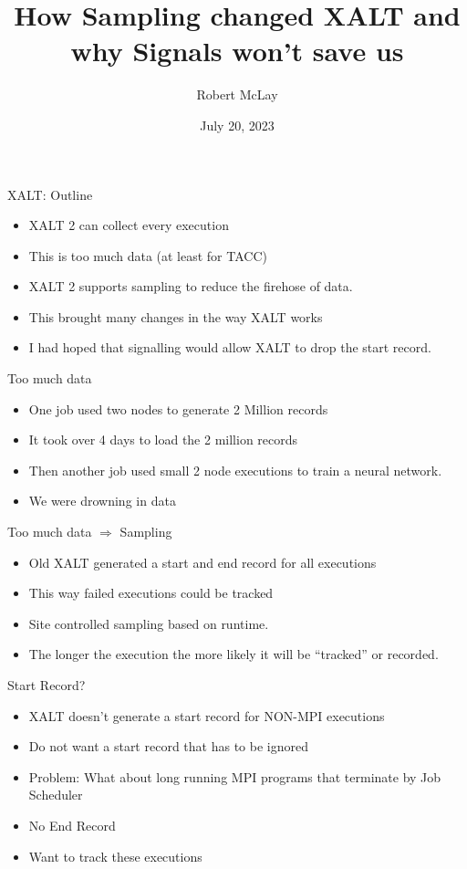 \documentclass{beamer}
\begin{document}
\title[XALT]{How Sampling changed XALT and why Signals won't save us}
\author{Robert McLay}
\date{July 20, 2023}

\frame{\titlepage}

\begin{frame}{XALT: Outline}
  \begin{itemize}
    \item XALT 2 can collect every execution
    \item This is too much data (at least for TACC)
    \item XALT 2 supports sampling to reduce the firehose of data.
    \item This brought many changes in the way XALT works
    \item I had hoped that signalling would allow XALT to drop the
      start record.  
  \end{itemize}
\end{frame}

\begin{frame}{Too much data}
  \begin{itemize}
    \item One job used two nodes to generate 2 Million records
    \item It took over 4 days to load the 2 million records
    \item Then another job used small 2 node executions to train a
      neural network.
    \item We were drowning in data
  \end{itemize}
\end{frame}

\begin{frame}{Too much data $\Rightarrow$ Sampling}
  \begin{itemize}
    \item Old XALT generated a start and end record for all executions
    \item This way failed executions could be tracked
    \item Site controlled sampling based on runtime.
    \item The longer the execution the more likely it will be
      ``tracked'' or recorded.
  \end{itemize}
\end{frame}

\begin{frame}{Start Record?}
  \begin{itemize}
    \item XALT doesn't generate a start record for NON-MPI executions
    \item Do not want a start record that has to be ignored
    \item Problem: What about long running MPI programs that terminate
      by Job Scheduler
    \item No End Record
    \item Want to track these executions
  \end{itemize}
\end{frame}
\end{document}
